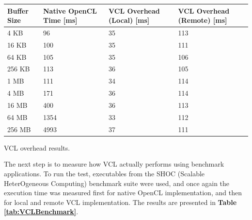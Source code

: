 \begin{tablehere}
{\footnotesize
\begin{tabular}{|p{}|p{}|p{}|p{}|}\hline
\textbf{Buffer Size} & \textbf{Native OpenCL Time} [ms] & \textbf{VCL Overhead (Local)} [ms] & \textbf{VCL Overhead (Remote)} [ms]\\ \hline
4 KB & 96 & 35 & 113 \\ \hline
16 KB & 100 & 35 & 111 \\ \hline
64 KB & 105 & 35 & 106 \\ \hline
256 KB & 113 & 36 & 105 \\ \hline
1 MB & 111 & 34 & 114 \\ \hline
4 MB & 171 & 36 & 114 \\ \hline
16 MB & 400 & 36 & 113 \\ \hline
64 MB & 1354 & 33 & 112 \\ \hline
256 MB & 4993 & 37 & 111 \\ \hline
\end{tabular}}
  \caption{VCL overhead results.\\}
	\label{tab:VCLOverhead}
\end{tablehere}

The next step is to measure how VCL actually performs using benchmark applications. To run the test, executables from the SHOC (Scalable HeterOgeneous Computing) benchmark suite were used, and once again the execution time was measured first for native OpenCL implementation, and then for local and remote VCL implementation. The results are presented in \textbf{Table \ref{tab:VCLBenchmark}}.\\

